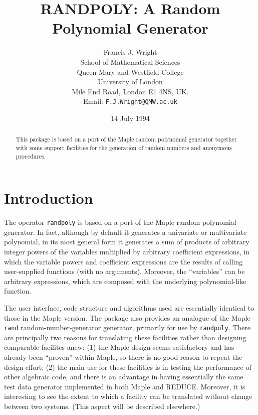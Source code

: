 
\newcommand{\REDUCE}{REDUCE}

\title{RANDPOLY: A Random Polynomial Generator}

\author{Francis J. Wright \\
School of Mathematical Sciences \\
Queen Mary and Westfield College \\
University of London \\
Mile End Road, London E1 4NS, UK. \\
Email: {\tt F.J.Wright@QMW.ac.uk}}

\date{14 July 1994}


\maketitle

\begin{abstract}
  This package is based on a port of the Maple random polynomial
  generator together with some support facilities for the generation
  of random numbers and anonymous procedures.
\end{abstract}


\section{Introduction}

The operator {\tt randpoly} is based on a port of the Maple random
polynomial generator.  In fact, although by default it generates a
univariate or multivariate polynomial, in its most general form it
generates a sum of products of arbitrary integer powers of the
variables multiplied by arbitrary coefficient expressions, in which
the variable powers and coefficient expressions are the results of
calling user-supplied functions (with no arguments).  Moreover, the
``variables'' can be arbitrary expressions, which are composed with
the underlying polynomial-like function.

The user interface, code structure and algorithms used are essentially
identical to those in the Maple version.  The package also provides an
analogue of the Maple {\tt rand} random-number-generator generator,
primarily for use by {\tt randpoly}.  There are principally two
reasons for translating these facilities rather than designing
comparable facilites anew: (1) the Maple design seems satisfactory and
has already been ``proven'' within Maple, so there is no good reason
to repeat the design effort; (2) the main use for these facilities is
in testing the performance of other algebraic code, and there is an
advantage in having essentially the same test data generator
implemented in both Maple and REDUCE\@.  Moreover, it is interesting
to see the extent to which a facility can be translated without change
between two systems.  (This aspect will be described elsewhere.)

